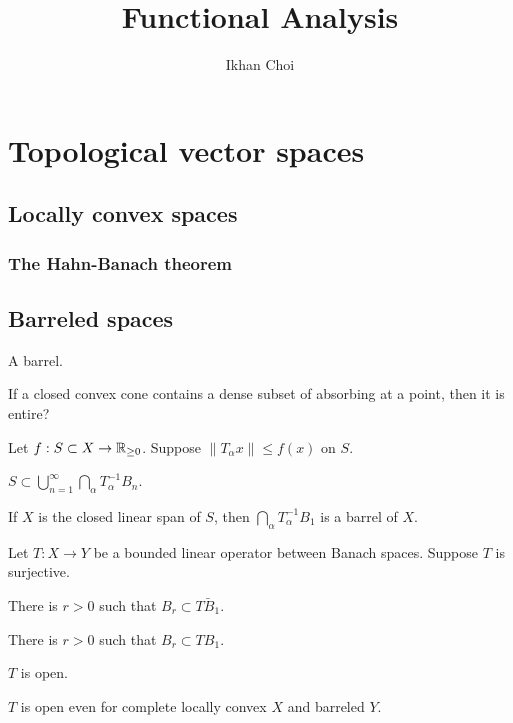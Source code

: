 \documentclass{../note}
\begin{document}
\title{Functional Analysis}
\author{Ikhan Choi}
\maketitle
\tableofcontents

\part{Topological vector spaces}

\chapter{Locally convex spaces}
\section{The Hahn-Banach theorem}


\chapter{Barreled spaces}


\begin{prb}

\begin{parts}
\end{parts}
\end{prb}
\begin{prb}
A barrel.
\end{prb}

If a closed convex cone contains a dense subset of absorbing at a point, then it is entire?

\begin{prb}
Let $f:S\subset X\to\mathbb{R}_{\ge0}$.
Suppose $\|T_\alpha x\|\le f(x)$ on $S$.
\begin{parts}
\item $S\subset\bigcup_{n=1}^\infty\bigcap_\alpha T_\alpha^{-1}B_n$.
\item If $X$ is the closed linear span of $S$, then $\bigcap_\alpha T_\alpha^{-1}B_1$ is a barrel of $X$.
\end{parts}
\end{prb}


\begin{prb}
Let $T:X\to Y$ be a bounded linear operator between Banach spaces.
Suppose $T$ is surjective.
\begin{parts}
\item There is $r>0$ such that $B_r\subset\bar{TB_1}$.
\item There is $r>0$ such that $B_r\subset TB_1$.
\item $T$ is open.
\item $T$ is open even for complete locally convex $X$ and barreled $Y$.
\end{parts}
\end{prb}
\end{document}
